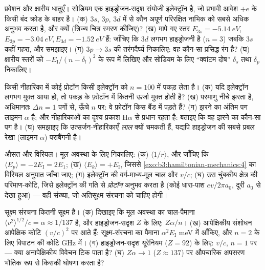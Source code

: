\begin{exercise}[$\star\star$]\label{exo:b3:hydrogen-atom:8}
प्रवेशन और क्षारीय धातुएँ। सोडियम एक हाइड्रोजन-सदृश
संयोजी इलेक्ट्रॉन है, जो प्रभावी आवेश $+e$ के किसी बंद क्रोड के बाहर है।
(क) $3s$, $3p$, $3d$ में से कौन अपूर्ण परिरक्षित नाभिक को
सबसे अधिक अनुभव करता है, और क्यों (त्रिज्य चित्र स्मरण कीजिए)? (ख) मापे गए
स्तर $E_{3s} = \qty{-5.14}{eV}$, $E_{3p} = \qty{-3.04}{eV},
E_{3d} = \qty{-1.52}{eV}$ हैं: जाँचिए कि $3d$ लगभग हाइड्रोजनी है
($n = 3$) जबकि $3s$ कहीं गहरा, और समझाइए। (ग)
$3p \to 3s$ की तरंगदैर्घ्य निकालिए: वह कौन-सा प्रसिद्ध रंग है? (घ)
क्षारीय स्तरों को $-E_{\text{I}}/(n - \delta_l)^2$ के रूप में लिखिए और
सोडियम के लिए ``क्वांटम दोष'' $\delta_s$ तथा $\delta_p$ निकालिए।
\end{exercise}

\begin{exercise}[$\star\star$]\label{exo:b3:hydrogen-atom:9}
किसी नीहारिका में कोई प्रोटॉन किसी इलेक्ट्रॉन को $n = 100$ में
पकड़ लेता है। (क) यदि इलेक्ट्रॉन लगभग मुक्त आया हो, तो पकड़ के फ़ोटॉन
में कितनी ऊर्जा मुक्त होती है? (ख) परमाणु नीचे झरता है, अधिमानतः
$\Delta n = 1$ पगों से, ऊँचे $n$ पर: वे फ़ोटॉन किस बैंड में
पड़ते हैं? (ग) झरने का अंतिम पग लाइमन $\alpha$ है; और नीहारिकाओं का
दृश्य प्रकाश H$\alpha$ से प्रधान रहता है: बताइए कि वह झरने का
कौन-सा पग है। (घ) समझाइए कि उत्सर्जन-नीहारिकाएँ \emph{लाल} क्यों
चमकती हैं, यद्यपि हाइड्रोजन की सबसे प्रबल रेखा (लाइमन $\alpha$)
पराबैंगनी है।
\end{exercise}

\begin{exercise}[$\star\star\star$]\label{exo:b3:hydrogen-atom:10}
औसत और विरियल। मूल अवस्था के लिए निकालिए: (क)
$\langle 1/r\rangle$, और जाँचिए कि $\langle E_p\rangle = -2E_{\text{I}}
= 2E_1$; (ख) $\langle E_k\rangle = +E_{\text{I}}$, जिससे
\cref{exo:b3:hamiltonian-mechanics:4} का विरियल अनुपात जाँचा जाए; (ग)
इलेक्ट्रॉन की वर्ग-माध्य-मूल चाल और $v/c$; (घ) उस चुंबकीय क्षेत्र की परिमाण-कोटि, जिसे
इलेक्ट्रॉन की गति से \emph{प्रोटॉन} अनुभव करता है (कोई धारा-पाश
$ev/2\pi a_0$, दूरी $a_0$ से देखा हुआ) --- वही संख्या, जो अतिसूक्ष्म
संरचना को चाहिए होगी।
\end{exercise}

\begin{exercise}[$\star\star\star$]\label{exo:b3:hydrogen-atom:11}
सूक्ष्म संरचना कितनी सूक्ष्म है। (क) दिखाइए कि मूल अवस्था का चाल-पैमाना
$\langle v^2\rangle^{1/2}/c = \alpha \approx 1/137$ है, और
हाइड्रोजन-सदृश $Z$ के लिए: $Z\alpha/n$। (ख) आपेक्षिकीय संशोधन
आपेक्षिक कोटि $(v/c)^2$ पर आते हैं: सूक्ष्म-संरचना का पैमाना
$\alpha^2E_{\text{I}}$ \unit{meV} में आँकिए, और
$n = 2$ के लिए विपाटन की कोटि GHz में। (ग) हाइड्रोजन-सदृश यूरेनियम ($Z = 92$) के लिए: $v/c$,
$n = 1$ पर --- क्या अनापेक्षिकीय विवेचन टिक पाता है? (घ) $Z\alpha \to 1$
($Z \approx 137$) पर औपचारिक अपसरण भौतिक रूप से किसकी घोषणा करता है?
\end{exercise}


